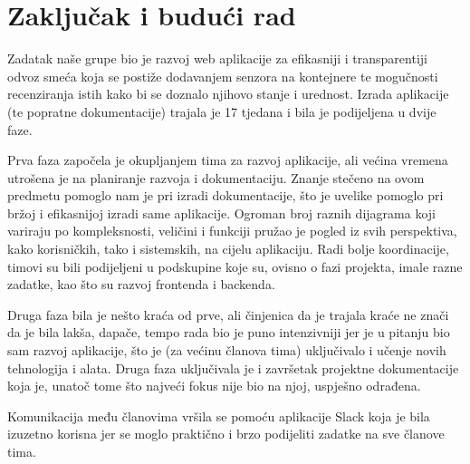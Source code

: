 \chapter{Zaključak i budući rad}
		
		
		

		Zadatak naše grupe bio je razvoj web aplikacije za efikasniji i transparentiji odvoz smeća koja se postiže dodavanjem senzora na kontejnere te mogučnosti recenziranja istih kako bi se doznalo njihovo stanje i urednost. Izrada aplikacije (te popratne dokumentacije) trajala je 17 tjedana i bila je podijeljena u dvije faze.
		
		Prva faza započela je okupljanjem tima za razvoj aplikacije, ali većina vremena utrošena je na planiranje razvoja i dokumentaciju. Znanje stečeno na ovom predmetu pomoglo nam je pri izradi dokumentacije, što je uvelike pomoglo pri bržoj i efikasnijoj izradi same aplikacije. Ogroman broj raznih dijagrama koji variraju po kompleksnosti, veličini i funkciji pružao je pogled iz svih perspektiva, kako korisničkih, tako i sistemskih, na cijelu aplikaciju. Radi bolje koordinacije, timovi su bili podijeljeni u podskupine koje su, ovisno o fazi projekta, imale razne zadatke, kao što su razvoj frontenda i backenda. 
		
		Druga faza bila je nešto kraća od prve, ali činjenica da je trajala kraće ne znači da je bila lakša, dapače, tempo rada bio je puno intenzivniji jer je u pitanju bio sam razvoj aplikacije, što je (za većinu članova tima) uključivalo i učenje novih tehnologija i alata. Druga faza uključivala je i završetak projektne dokumentacije koja je, unatoč tome što najveći fokus nije bio na njoj, uspješno odrađena.
		
		Komunikacija među članovima vršila se pomoću aplikacije Slack koja je bila izuzetno korisna jer se moglo praktično i brzo podijeliti zadatke na sve članove tima.
		
